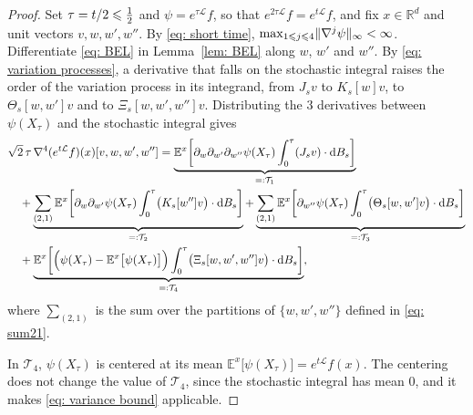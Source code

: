 \begin{proof}
    Set $\tau = t/2 \leqslant \frac12$ and $\psi = e^{\tau\mathcal L} f$, so that $e^{2\tau\mathcal L} f = e^{t\mathcal L} f$, and fix $x \in \mathbb R^d$ and unit vectors $v, w, w', w''$. By \eqref{eq: short time}, $\max_{1 \leqslant j \leqslant 4} \lVert \nabla^j \psi \rVert_\infty < \infty$. Differentiate \eqref{eq: BEL} in Lemma~\ref{lem: BEL} along $w$, $w'$ and $w''$. By \eqref{eq: variation processes}, a derivative that falls on the stochastic integral raises the order of the variation process in its integrand, from $J_s v$ to $K_s[w] v$, to $\Theta_s[w,w'] v$ and to $\Xi_s[w,w',w''] v$. Distributing the $3$ derivatives between $\psi(X_\tau)$ and the stochastic integral gives
    \begin{align}
        & \sqrt2\, \tau\, \nabla^4 (e^{t\mathcal L} f)(x)[v,w,w',w'']  = \underbrace{\mathbb E^x \biggl[ \partial_w \partial_{w'} \partial_{w''} \psi(X_\tau) \int_0^\tau (J_s v) \cdot \mathrm{d} B_s \biggr]}_{=: \mathcal T_1} \notag \\
        & \quad + \underbrace{\sum_{(2,1)} \mathbb E^x \biggl[ \partial_w \partial_{w'} \psi(X_\tau) \int_0^\tau \bigl( K_s[w''] v \bigr) \cdot \mathrm{d} B_s \biggr]}_{=: \mathcal T_2} + \underbrace{\sum_{(2,1)} \mathbb E^x \biggl[ \partial_{w''} \psi(X_\tau) \int_0^\tau \bigl( \Theta_s[w,w'] v \bigr) \cdot \mathrm{d} B_s \biggr]}_{=: \mathcal T_3} \notag \\
        & \quad + \underbrace{\mathbb E^x \biggl[ \Bigl( \psi(X_\tau) - \mathbb E^x \bigl[ \psi(X_\tau) \bigr] \Bigr) \int_0^\tau \bigl( \Xi_s[w,w',w''] v \bigr) \cdot \mathrm{d} B_s \biggr]}_{=: \mathcal T_4} ,
        \label{eq: BEL third}
    \end{align}
    where $\sum_{(2,1)}$ is the sum over the partitions of $\{w,w',w''\}$ defined in \eqref{eq: sum21}.

    In $\mathcal T_4$, $\psi(X_\tau)$ is centered at its mean $\mathbb E^x \bigl[ \psi(X_\tau) \bigr] = e^{t\mathcal L} f(x)$. The centering does not change the value of $\mathcal T_4$, since the stochastic integral has mean $0$, and it makes \eqref{eq: variance bound} applicable.


\end{proof}
